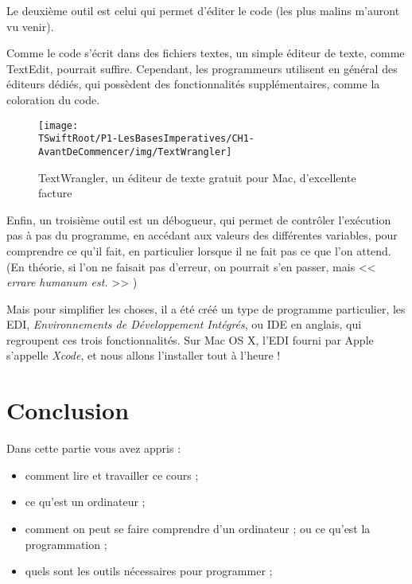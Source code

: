 %

Le deuxième outil est celui qui permet d'éditer le code (les plus malins m'auront vu venir).

Comme le code s'écrit dans des fichiers textes, un simple éditeur de texte,
comme TextEdit, pourrait suffire.
Cependant, les programmeurs utilisent en général des éditeurs dédiés,
qui possèdent des fonctionnalités supplémentaires, comme la coloration du code.
\begin{figure}[H]
\centering
\texttt{[image: \\TSwiftRoot/P1-LesBasesImperatives/CH1-AvantDeCommencer/img/TextWrangler]}
\caption{TextWrangler, un éditeur de texte gratuit pour Mac, d'excellente facture}
\end{figure}

Enfin, un troisième outil est un débogueur,
qui permet de contrôler l'exécution pas à pas du programme,
en accédant aux valeurs des différentes variables,
pour comprendre ce qu'il fait,
en particulier lorsque il ne fait pas ce que l'on attend.
(En théorie, si l'on ne faisait pas d'erreur,
on pourrait s'en passer,
mais << \emph{errare humanum est.} >> )

Mais pour simplifier les choses, il a été créé un type de programme particulier,
les EDI, \emph{Environnements de Développement Intégrés}, ou IDE en anglais,
qui regroupent ces trois fonctionnalités.
Sur Mac OS X, l'EDI fourni par Apple s'appelle \emph{Xcode},
et nous allons l'installer tout à l'heure !

\section*{Conclusion}
{}
Dans cette partie vous avez appris :
\begin{itemize}
\item comment lire et travailler ce cours ;
\item ce qu'est un ordinateur ;
\item comment on peut se faire comprendre d'un ordinateur ;
ou ce qu'est la programmation ;
\item quels sont les outils nécessaires pour programmer ;
\end{itemize}

